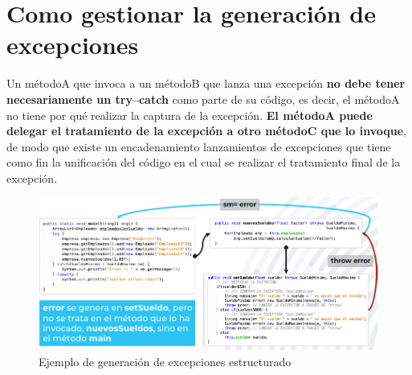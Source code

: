 \documentclass{article}
\begin{document}
\newpage

\section{Como gestionar la generación de excepciones}
Un métodoA que invoca a un métodoB que lanza una excepción \textbf{no debe tener necesariamente un try–catch} como parte de su código, es decir, el métodoA no tiene por qué realizar la captura de la excepción. \textbf{El métodoA puede delegar el tratamiento de la excepción a otro métodoC que lo invoque}, de modo que existe un encadenamiento lanzamientos de excepciones que tiene como fin la unificación del código en el cual se realizar el tratamiento final de la excepción.

\begin{figure}[h]
    \centering
    \includegraphics[width=\textwidth]{img-t7/img_737_29.png}
    \caption{Ejemplo de generación de excepciones estructurado}
\end{figure}

\end{document}

